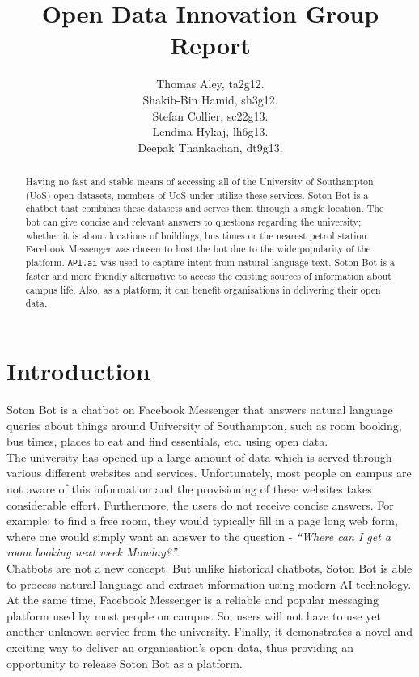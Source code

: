 \documentclass[journal, a4paper]{IEEEtran}
\begin{document}
\title{Open Data Innovation Group Report}
\author{Thomas Aley, ta2g12.\\
Shakib-Bin Hamid, sh3g12.\\
Stefan Collier, sc22g13.\\
Lendina Hykaj, lh6g13.\\
Deepak Thankachan, dt9g13.}
\maketitle

\begin{abstract}
Having no fast and stable means of accessing all of the University of Southampton (UoS) open datasets, members of UoS under-utilize these services. Soton Bot is a chatbot that combines these datasets and serves them through a single location. The bot can give concise and relevant answers to questions regarding the university; whether it is about locations of buildings, bus times or the nearest petrol station. Facebook Messenger was chosen to host the bot due to the wide popularity of the platform. \texttt{API.ai} was used to capture intent from natural language text. Soton Bot is a faster and more friendly alternative to access the existing sources of information about campus life. Also, as a platform, it can benefit organisations in delivering their open data.
\end{abstract}

\section{Introduction}
Soton Bot is a chatbot on Facebook Messenger that answers natural language queries about things around University of Southampton, such as room booking, bus times, places to eat and find essentials, etc. using open data.\\

The university has opened up a large amount of data which is served through various different websites and services. Unfortunately, most people on campus are not aware of this information and the provisioning of these websites takes considerable effort. Furthermore, the users do not receive concise answers. For example: to find a free room, they would typically fill in a page long web form, where one would simply want an answer to the question - \textit{``Where can I get a room booking next week Monday?''}.\\

Chatbots are not a new concept. But unlike historical chatbots, Soton Bot is able to process natural language and extract information using modern AI technology. At the same time, Facebook Messenger is a reliable and popular messaging platform used by most people on campus. So, users will not have to use yet another unknown service from the university. Finally, it demonstrates a novel and exciting way to deliver an organisation’s open data, thus providing an opportunity to release Soton Bot as a platform.
    
\end{document}
